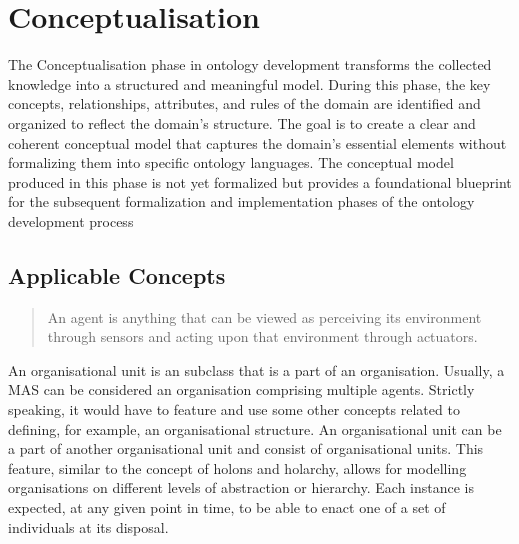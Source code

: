 \chapter{Conceptualisation}\label{ch: Conceptualisation}


The Conceptualisation phase in ontology development transforms the collected knowledge into a structured and meaningful model. During this phase, the key concepts, relationships, attributes, and rules of the domain are identified and organized to reflect the domain's structure. The goal is to create a clear and coherent conceptual model that captures the domain's essential elements without formalizing them into specific ontology languages. The conceptual model produced in this phase is not yet formalized but provides a foundational blueprint for the subsequent formalization and implementation phases of the ontology development process



\section{Applicable Concepts}

\blockquote[{{\cite[p. 54]{russell2022ArtificialIntelligenceModern}}}]{An agent is anything that can be viewed as perceiving its environment through sensors and acting upon that environment through actuators.} 

 An organisational unit is an  subclass that is a part of an organisation. Usually, a \ac{MAS} can be considered an organisation comprising multiple agents. Strictly speaking, it would have to feature and use some other concepts related to defining, for example, an organisational structure. An organisational unit can be a part of another organisational unit and consist of organisational units. This feature, similar to the concept of holons and holarchy, allows for modelling organisations on different levels of abstraction or hierarchy. Each  instance is expected, at any given point in time, to be able to enact one of a set of  individuals at its disposal. 

